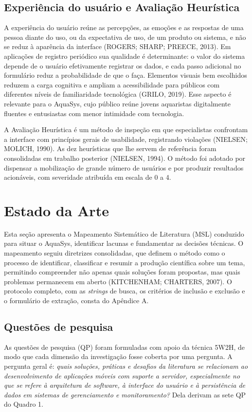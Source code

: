 \documentclass[12pt,oneside,a4paper,brazilian]{abntex2}
\begin{document}
\subsection{Experiência do usuário e Avaliação Heurística}
A experiência do usuário reúne as percepções, as emoções e as respostas de uma pessoa diante do uso, ou da expectativa de uso, de um produto ou sistema, e não se reduz à aparência da interface (ROGERS; SHARP; PREECE, 2013). Em aplicações de registro periódico sua qualidade é determinante: o valor do sistema depende de o usuário efetivamente registrar os dados, e cada passo adicional no formulário reduz a probabilidade de que o faça. Elementos visuais bem escolhidos reduzem a carga cognitiva e ampliam a acessibilidade para públicos com diferentes níveis de familiaridade tecnológica (GRILO, 2019). Esse aspecto é relevante para o AquaSys, cujo público reúne jovens aquaristas digitalmente fluentes e entusiastas com menor intimidade com tecnologia.

A Avaliação Heurística é um método de inspeção em que especialistas confrontam a interface com princípios gerais de usabilidade, registrando violações (NIELSEN; MOLICH, 1990). As dez heurísticas que lhe servem de referência foram consolidadas em trabalho posterior (NIELSEN, 1994). O método foi adotado por dispensar a mobilização de grande número de usuários e por produzir resultados acionáveis, com severidade atribuída em escala de 0 a 4.


\section{Estado da Arte}
Esta seção apresenta o Mapeamento Sistemático de Literatura (MSL) conduzido para situar o AquaSys, identificar lacunas e fundamentar as decisões técnicas. O mapeamento seguiu diretrizes consolidadas, que definem o método como o processo de identificar, classificar e resumir a produção científica sobre um tema, permitindo compreender não apenas quais soluções foram propostas, mas quais problemas permanecem em aberto (KITCHENHAM; CHARTERS, 2007). O protocolo completo, com as \textit{strings} de busca, os critérios de inclusão e exclusão e o formulário de extração, consta do Apêndice A.


\subsection{Questões de pesquisa}
As questões de pesquisa (QP) foram formuladas com apoio da técnica 5W2H, de modo que cada dimensão da investigação fosse coberta por uma pergunta. A pergunta geral é: \textit{quais soluções, práticas e desafios da literatura se relacionam ao desenvolvimento de aplicações móveis com suporte a servidor, especialmente no que se refere à arquitetura de software, à interface do usuário e à persistência de dados em sistemas de gerenciamento e monitoramento?} Dela derivam as sete QP do Quadro 1.
\end{document}
